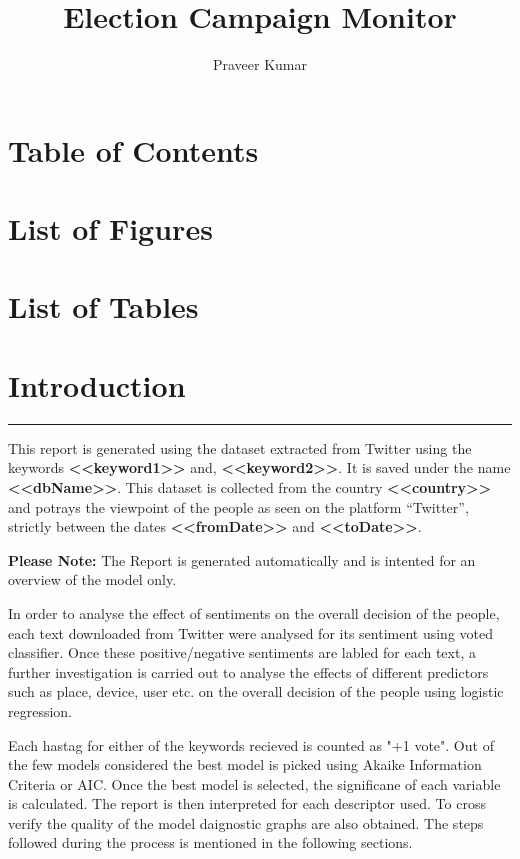 \documentclass[a4paper,12pt, notitlepage]{article}
\makeatletter
\newcommand*{\toc}{\@starttoc{toc}}{\let\clearpage\relax}
\newcommand*{\lof}{\@starttoc{lof}}{\let\clearpage\relax}
\newcommand*{\lot}{\@starttoc{lot}}{\let\clearpage\relax}
\makeatother
\begin{document}
\title{Election Campaign Monitor}
\author{Praveer Kumar}
\maketitle
\section*{Table of Contents}
\toc
\section*{List of Figures}
\lof
\section*{List of Tables}
\lot

\section{Introduction}
\rule{\textwidth}{0.5pt}
\par
This report is generated using the dataset extracted from Twitter using the keywords \textbf{<<keyword1>>} and, \textbf{<<keyword2>>}. It is saved under the name \textbf{<<dbName>>}. This dataset is collected from the country \textbf{<<country>>} and potrays the viewpoint of the people as seen on the platform ``Twitter'', strictly between the dates \textbf{<<fromDate>>} and \textbf{<<toDate>>}.

\begin{mdframed}[hidealllines=true,backgroundcolor=blue!20]
\textbf{Please Note:} The Report is generated automatically and is intented for an overview of the model only.
\end{mdframed}
\par
In order to analyse the effect of sentiments on the overall decision of the people, each text downloaded from Twitter were analysed for its sentiment using voted classifier. Once these positive/negative sentiments are labled for each text, a further investigation is carried out to analyse the effects of different predictors such as place, device, user etc. on the overall decision of the people using logistic regression.
\par
Each hastag for either of the keywords recieved is counted as "+1 vote". Out of the few models considered the best model is picked using Akaike Information Criteria or AIC. Once the best model is selected, the significane of each variable is calculated. The report is then interpreted for each descriptor used. To cross verify the quality of the model daignostic graphs are also obtained. The steps followed during the process is mentioned in the following sections.
\end{document}
